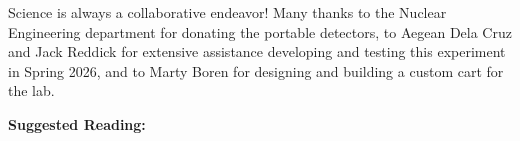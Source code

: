 \documentclass{../lab}
\begin{document}

Science is always a collaborative endeavor! Many thanks to the Nuclear Engineering department for donating the portable detectors, to Aegean Dela Cruz and Jack Reddick for extensive assistance developing and testing this experiment in Spring 2026, and to Marty Boren for designing and building a custom cart for the lab.

\noindent\textbf{Suggested Reading:}
\end{document}
